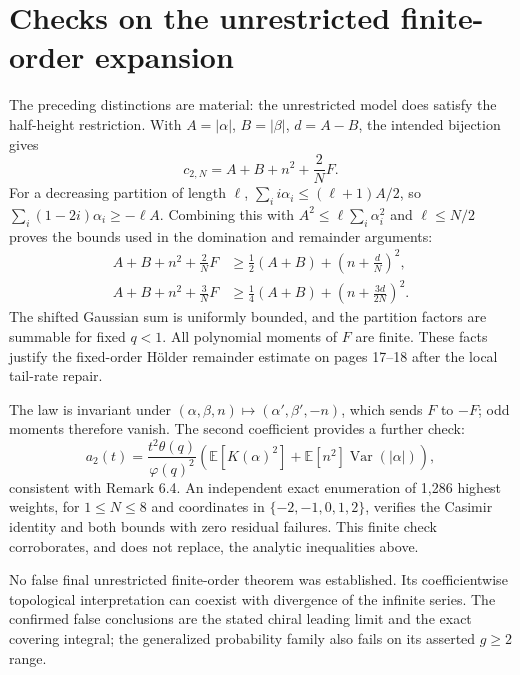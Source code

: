 \documentclass[10pt]{article}
\begin{document}
\section*{Checks on the unrestricted finite-order expansion}
The preceding distinctions are material: the unrestricted model does satisfy the half-height restriction. With \(A=|\alpha|\), \(B=|\beta|\), \(d=A-B\), the intended bijection gives \[c_{2,N}=A+B+n^2+\frac2N F.\] For a decreasing partition of length \(\ell\), \(\sum_i i\alpha_i\leq(\ell+1)A/2\), so \(\sum_i(1-2i)\alpha_i\geq-\ell A\). Combining this with \(A^2\leq\ell\sum_i\alpha_i^2\) and \(\ell\leq N/2\) proves the bounds used in the domination and remainder arguments: \[\begin{aligned}
A+B+n^2+\frac2N F
 &\geq \frac12(A+B)+\left(n+\frac dN\right)^2,\\
A+B+n^2+\frac3N F
 &\geq \frac14(A+B)+\left(n+\frac{3d}{2N}\right)^2.\end{aligned}\] The shifted Gaussian sum is uniformly bounded, and the partition factors are summable for fixed \(q<1\). All polynomial moments of \(F\) are finite. These facts justify the fixed-order Hölder remainder estimate on pages 17–18 after the local tail-rate repair.\par
The law is invariant under \((\alpha,\beta,n)\mapsto(\alpha',\beta',-n)\), which sends \(F\) to \(-F\); odd moments therefore vanish. The second coefficient provides a further check: \[a_2(t)=\frac{t^2\theta(q)}{\varphi(q)^2}
\left(\mathbb E[K(\alpha)^2]+\mathbb E[n^2]\operatorname{Var}(|\alpha|)\right),\] consistent with Remark 6.4. An independent exact enumeration of 1,286 highest weights, for \(1\leq N\leq8\) and coordinates in \(\{-2,-1,0,1,2\}\), verifies the Casimir identity and both bounds with zero residual failures. This finite check corroborates, and does not replace, the analytic inequalities above.\par
No false final unrestricted finite-order theorem was established. Its coefficientwise topological interpretation can coexist with divergence of the infinite series. The confirmed false conclusions are the stated chiral leading limit and the exact covering integral; the generalized probability family also fails on its asserted \(g\geq2\) range.\par
\end{document}
